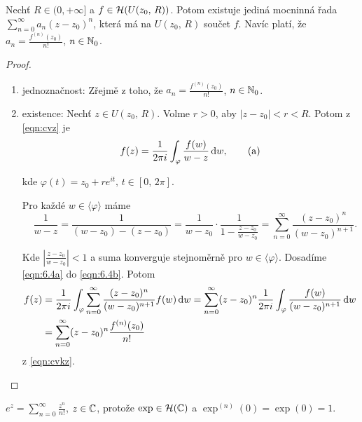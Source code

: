 \begin{theorem}
Nechť $R \in (0, +\infty]$ a $f \in \operatorname{\mathcal{H}} (U(z_0,\,R))$. Potom existuje jediná mocninná řada $\sum\limits _{n=0} ^{\infty} a_n(z-z_0)^n$, která má na $U(z_0,\,R)$ součet $f$. Navíc platí, že $a_n=\frac{f^{(n)}(z_0)}{n!}$, $n \in \operatorname{\mathbb{N}}_0$.
\end{theorem}

\begin{proof}
\begin{enumerate}
    \item jednoznačnost: Zřejmě z toho, že $a_n=\frac{f^{(n)}(z_0)}{n!}$, $n \in \operatorname{\mathbb{N}}_0$.
    \item existence: Nechť $z \in U(z_0,\,R)$. Volme $r>0$, aby $|z-z_0|<r<R$. Potom z \cref{eqn:cvz} je
    \begin{equation}
        f(z)=\frac{1}{2 \pi i} \int_\varphi \frac{f(w)}{w-z} \mathop{}\!\mathrm{d} w,
        \tag{a}
        \label{eqn:6.4a}
    \end{equation}
    
    kde $\varphi(t)=z_0+re^{it} \text{, } t \in [0,\,2\pi]$.
    
    Pro každé $w \in \langle \varphi \rangle$ máme
    \begin{equation}
        \quad \frac{1}{w-z}=\frac{1}{(w-z_0)-(z-z_0)}=\frac{1}{w-z_0}\cdot\frac{1}{1-\frac{z-z_0}{w-z_0}}=\sum_{n=0}^\infty \frac{(z-z_0)^n}{(w-z_0)^{n+1}} \text{.}    
        \label{eqn:6.4b}
        \tag{b}
    \end{equation}
    
    Kde $|\frac{z-z_0}{w-z_0}|<1$ a suma konverguje stejnoměrně pro $w \in  \langle \varphi \rangle$. Dosadíme \cref{eqn:6.4a} do \cref{eqn:6.4b}. Potom
    \begin{equation*}
        \begin{split}
    f(z) &=\frac{1}{2 \pi i} \int_\varphi \sum_{n=0}^\infty \frac{(z-z_0)^n}{(w-z_0)^{n+1}} f(w) \mathop{}\!\mathrm{d} w= 
    \sum_{n=0}^\infty (z-z_0)^n \frac{1}{2 \pi i} \int_\varphi \frac{f(w)}{(w-z_0)^{n+1}} \mathop{}\!\mathrm{d} w \\
     &=\sum_{n=0}^\infty (z-z_0)^n \frac{f^{(n)}(z_0)}{n!}
     \end{split}
    \end{equation*}
    z \cref{eqn:cvkz}.
\end{enumerate}
\end{proof}

\begin{example}
$e^z=\sum\limits_{n=0}^\infty \frac{z^n}{n!}$, $z \in \operatorname{\mathbb{C}}  $, protože $\exp \in \operatorname{\mathcal{H}} (\operatorname{\mathbb{C}}  )$ a $\exp^{(n)}(0)=\exp(0)=1$.
\end{example}

